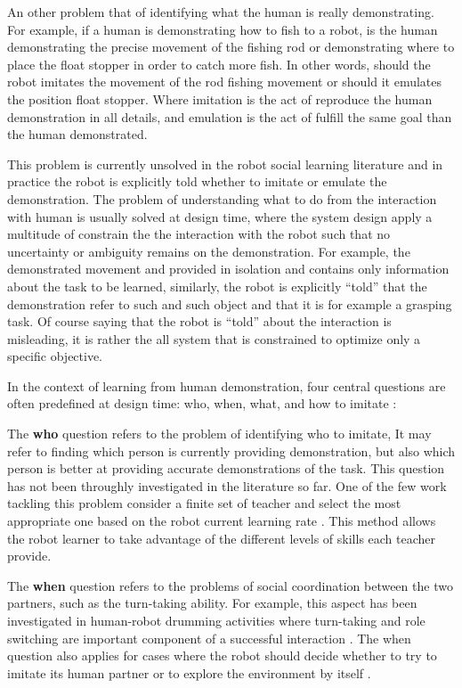 An other problem that of identifying what the human is really demonstrating. For example, if a human is demonstrating how to fish to a robot, is the human demonstrating the precise movement of the fishing rod or demonstrating where to place the float stopper in order to catch more fish. In other words, should the robot imitates the movement of the rod fishing movement or should it emulates the position float stopper. Where imitation is the act of reproduce the human demonstration in all details, and emulation is the act of fulfill the same goal than the human demonstrated. 

This problem is currently unsolved in the robot social learning literature and in practice the robot is explicitly told whether to imitate or emulate the demonstration. The problem of understanding what to do from the interaction with human is usually solved at design time, where the system design apply a multitude of constrain the the interaction with the robot such that no uncertainty or ambiguity remains on the demonstration. For example, the demonstrated movement and provided in isolation and contains only information about the task to be learned, similarly, the robot is explicitly ``told'' that the demonstration refer to such and such object and that it is for example a grasping task. Of course saying that the robot is ``told'' about the interaction is misleading, it is rather the all system that is constrained to optimize only a specific objective.

In the context of learning from human demonstration, four central questions are often predefined at design time: who, when, what, and how to imitate \cite{nehaniv2000hummingbirds}:

The \textbf{who} question refers to the problem of identifying who to imitate, It may refer to finding which person is currently providing demonstration, but also which person is better at providing accurate demonstrations of the task. This question has not been throughly investigated in the literature so far. One of the few work tackling this problem consider a finite set of teacher and select the most appropriate one based on the robot current learning rate \cite{Nguyen2012PJBR}. This method allows the robot learner to take advantage of the different levels of skills each teacher provide.

The \textbf{when} question refers to the problems of social coordination between the two partners, such as the turn-taking ability. For example, this aspect has been investigated in human-robot drumming activities where turn-taking and role switching are important component of a successful interaction \cite{weinberg2006robot,kose2008emergent}. The when question also applies for cases where the robot should decide whether to try to imitate its human partner or to explore the environment by itself \cite{chernova09jair,Nguyen2012PJBR}. 

